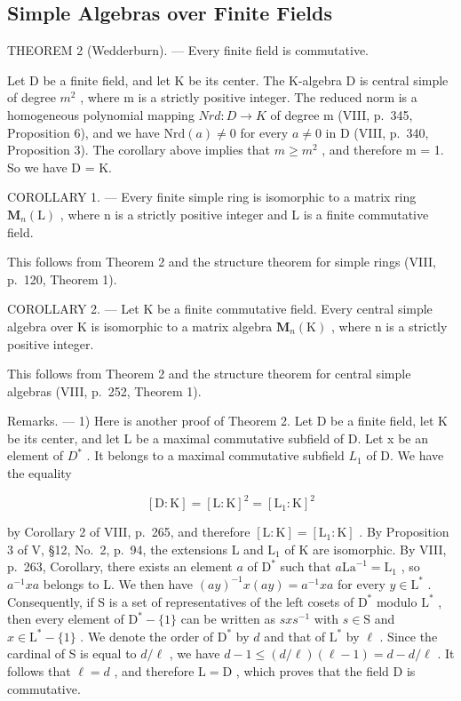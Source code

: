 \subsection{Simple Algebras over Finite Fields}

THEOREM 2 (Wedderburn). --- Every finite field is commutative.

Let D be a finite field, and let K be its center. The K-algebra D is central simple of degree \(m^{2}\) , where m is a strictly positive integer. The reduced norm is a homogeneous polynomial mapping \(Nrd : D \to K\) of degree m (VIII, p.~345, Proposition 6), and we have \(\text{Nrd}(a) \neq 0\) for every \(a \neq 0\) in D (VIII, p.~340, Proposition 3). The corollary above implies that \(m \geqslant m^{2}\) , and therefore m = 1. So we have D = K.

COROLLARY 1. --- Every finite simple ring is isomorphic to a matrix ring \(\mathbf{M}_{n}(\mathrm{L})\) , where n is a strictly positive integer and L is a finite commutative field.

This follows from Theorem 2 and the structure theorem for simple rings (VIII, p.~120, Theorem 1).

COROLLARY 2. --- Let K be a finite commutative field. Every central simple algebra over K is isomorphic to a matrix algebra \(\mathbf{M}_{n}(\mathrm{K})\) , where n is a strictly positive integer.

This follows from Theorem 2 and the structure theorem for central simple algebras (VIII, p.~252, Theorem 1).

Remarks. --- 1) Here is another proof of Theorem 2. Let D be a finite field, let K be its center, and let L be a maximal commutative subfield of D. Let x be an element of \(D^{*}\) . It belongs to a maximal commutative subfield \(L_{1}\) of D. We have the equality

\[
[ \mathrm{D}: \mathrm{K} ] = [ \mathrm{L}: \mathrm{K} ] ^ {2} = [ \mathrm{L} _ {1}: \mathrm{K} ] ^ {2}
\]

by Corollary 2 of VIII, p.~265, and therefore \([\mathrm{L}:\mathrm{K}] = [\mathrm{L}_1:\mathrm{K}]\) . By Proposition 3 of V, §12, No.~2, p.~94, the extensions L and \(\mathrm{L}_1\) of K are isomorphic. By VIII, p.~263, Corollary, there exists an element \(a\) of \(\mathrm{D}^*\) such that \(a\mathrm{La}^{-1} = \mathrm{L}_1\) , so \(a^{-1}xa\) belongs to L. We then have \((ay)^{-1}x(ay) = a^{-1}xa\) for every \(y\in \mathrm{L}^*\) . Consequently, if S is a set of representatives of the left cosets of \(\mathrm{D}^*\) modulo \(\mathrm{L}^*\) , then every element of \(\mathrm{D}^* -\{1\}\) can be written as \(sxs^{-1}\) with \(s\in \mathrm{S}\) and \(x\in \mathrm{L}^* -\{1\}\) . We denote the order of \(\mathrm{D}^*\) by \(d\) and that of \(\mathrm{L}^*\) by \(\ell\) . Since the cardinal of S is equal to \(d / \ell\) , we have \(d - 1\leqslant (d / \ell)(\ell -1) = d - d / \ell\) . It follows that \(\ell = d\) , and therefore \(\mathrm{L} = \mathrm{D}\) , which proves that the field D is commutative.

